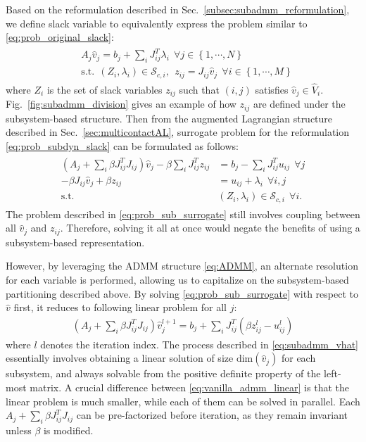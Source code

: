 \documentclass[lettersize,journal]{IEEEtran}
\begin{document}
Based on the reformulation described in Sec.~\ref{subsec:subadmm_reformulation}, we define slack variable to equivalently express the problem similar to \eqref{eq:prob_original_slack}:
\begin{align} \label{eq:prob_subdyn_slack}
\begin{split}
    &A_j\hat{v}_j = b_j + \sum_i J_{ij}^T\lambda_{i}~~\forall j\in\left\{1,\cdots,N\right\}\\
    &\text{s.t.}~~(Z_i,\lambda_i) \in \mathcal{S}_{c,i},~~z_{ij} = J_{ij}\hat{v}_j~~\forall i\in\left\{1,\cdots,M\right\}
\end{split}
\end{align}
where $Z_i$ is the set of slack variables $z_{ij}$ such that $(i,j)$ satisfies $\hat{v}_j\in\hat{V}_i$. 
Fig.~\ref{fig:subadmm_division} gives an example of how $z_{ij}$ are defined under the subsystem-based structure.
Then from the augmented Lagrangian structure described in Sec.~\ref{sec:multicontactAL}, surrogate problem for the reformulation \eqref{eq:prob_subdyn_slack} can be formulated as follows:
\begin{align} \label{eq:prob_sub_surrogate}
\begin{split}
(A_j + \sum_{i} \beta J_{ij}^TJ_{ij})\hat{v}_j - \beta \sum_{i} J_{ij}^Tz_{ij} &= b_j - \sum_{i} J_{ij}^Tu_{ij}~~\forall j\\
-\beta J_{ij}\hat{v}_j + \beta z_{ij} &=  u_{ij} + \lambda_i~~\forall i,j \\
\text{s.t.}~~&(Z_i,\lambda_i) \in \mathcal{S}_{c,i}~~\forall i.
\end{split}
\end{align}
The problem described in \eqref{eq:prob_sub_surrogate} still involves coupling between all $\hat{v}_j$ and $z_{ij}$. Therefore, solving it all at once would negate the benefits of using a subsystem-based representation.

However, by leveraging the ADMM structure \eqref{eq:ADMM}, an alternate resolution for each variable is performed, allowing us to capitalize on the subsystem-based partitioning described above.
By solving \eqref{eq:prob_sub_surrogate} with respect to $\hat{v}$ first, it reduces to following linear problem for all $j$:
\begin{align} \label{eq:subadmm_vhat}
(A_j + \sum_{i} \beta J_{ij}^TJ_{ij})\hat{v}_j^{l+1} = b_j + \sum_{i} J_{ij}^T(\beta z_{ij}^l-u_{ij}^l)
\end{align}
where $l$ denotes the iteration index.
The process described in \eqref{eq:subadmm_vhat} essentially involves obtaining a linear solution of size $\text{dim}(\hat{v}_j)$ for each subsystem, and always solvable from the positive definite property of the left-most matrix.
A crucial difference between \eqref{eq:vanilla_admm_linear} is that the linear problem is much smaller, while each of them can be solved in parallel. 
Each $A_j + \sum_{i} \beta J_{ij}^TJ_{ij}$ can be pre-factorized before iteration, as they remain invariant unless $\beta$ is modified.
\end{document}
